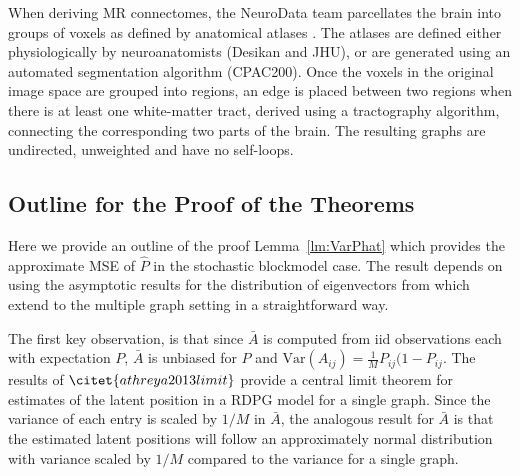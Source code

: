 \documentclass[a4paper]{article}
\begin{document}
When deriving MR connectomes, the NeuroData team parcellates the brain into groups of voxels as defined by anatomical atlases \cite{neurodata, kiar2016graph}. The atlases are defined either physiologically by neuroanatomists (Desikan and JHU), or are generated using an automated segmentation algorithm (CPAC200).
Once the voxels in the original image space are grouped into regions, an edge is placed between two regions when there is at least one white-matter tract, derived using a tractography algorithm, connecting the corresponding two parts of the brain.
The resulting graphs are undirected, unweighted and have no self-loops.


\subsection{Outline for the Proof of the Theorems}
\label{section:outline_proof}
Here we provide an outline of the proof Lemma~\ref{lm:VarPhat} which provides the approximate MSE of $\hat{P}$ in the stochastic blockmodel case.
The result depends on using the asymptotic results for the distribution of eigenvectors from \citet{athreya2013limit} which extend to the multiple graph setting in a straightforward way.

The first key observation, is that since $\bar{A}$ is computed from iid observations each with expectation $P$, $\bar{A}$ is unbiased for $P$ and $\mathrm{Var}(A_{ij}) = \frac{1}{M}P_{ij}(1-P_{ij}$.
The results of $\citet{athreya2013limit}$ provide a central limit theorem for estimates of the latent position in a RDPG model for a single graph.
Since the variance of each entry is scaled by $1/M$ in $\bar{A}$, the analogous result for $\bar{A}$ is that the estimated latent positions will follow an approximately normal distribution with variance scaled by $1/M$ compared to the variance for a single graph. 
	

\end{document}
